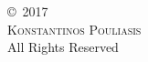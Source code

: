 \phantom{}\vspace{\fill}
\thispagestyle{plain}
\begin{center}
\copyright~2017\\
\textsc{Konstantinos Pouliasis}\\
All Rights Reserved\\
\end{center}